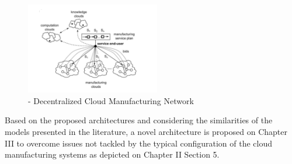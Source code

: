 \begin{figure}[h]
    \centering
    \includegraphics[height=4cm, keepaspectratio]{images/skulj-cmdna}
    \caption{\textcite{skulj_decentralised_2015} - Decentralized Cloud Manufacturing Network}
    \label{fig:skulj-cmdna}
\end{figure}

Based on the proposed architectures and considering the similarities of the models presented in the literature, a novel architecture is proposed on Chapter III to overcome issues not tackled by the typical configuration of the cloud manufacturing systems as depicted on Chapter II Section 5.

